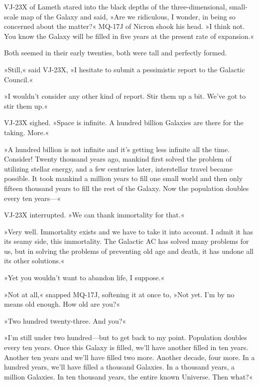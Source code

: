 \documentclass[11pt,twocolumn,paper=a5,pagesize,twoside]{scrartcl}
\newcommand{\q}[1]{»#1«}
\newcommand{\futuretwo}[1]{ #1 }
\newcommand{\specialinitiald}[1]{
\lettrine[lines=3,lhang=0.21,nindent=0em]{  
\fontspec{Final Frontier}\fontsize{48}{48}\selectfont #1}}
\begin{document}
\futuretwo{
\specialinitiald{V}{\selectfont J-23X} of Lameth stared into the black depths of the 
three-dimensional, small-scale map of the Galaxy and said, \q{Are we 
ridiculous, I wonder, in being so concerned about the matter?}
MQ-17J of Nicron shook his head. \q{I think not. You know the Galaxy 
will be filled in five years at the present rate of expansion.}

Both seemed in their early twenties, both were tall and perfectly formed.

\q{Still,} said VJ-23X, \q{I hesitate to submit a pessimistic report to the 
Galactic Council.}

\q{I wouldn't consider any other kind of report. Stir them up a bit. We've 
got to stir them up.}

VJ-23X sighed. \q{Space is infinite. A hundred billion Galaxies are there 
for the taking. More.}

\q{A hundred billion is not infinite and it's getting less infinite all the 
time. Consider! Twenty thousand years ago, mankind first solved the problem 
of utilizing stellar energy, and a few centuries later, interstellar travel 
became possible. It took mankind a million years to fill one small world and 
then only fifteen thousand years to fill the rest of the Galaxy. Now the 
population doubles every ten years---}

VJ-23X interrupted. \q{We can thank immortality for that.}

\q{Very well. Immortality exists and we have to take it into account. I admit 
it has its seamy side, this immortality. The Galactic AC has solved many 
problems for us, but in solving the problems of preventing old age and death, 
it has undone all its other solutions.}

\q{Yet you wouldn't want to abandon life, I suppose.}

\q{Not at all,} snapped MQ-17J, softening it at once to, \q{Not yet. I'm by 
no means old enough. How old are you?}

\q{Two hundred twenty-three. And you?}

\q{I'm still under two hundred---but to get back to my point. Population 
doubles every ten years. Once this Galaxy is filled, we'll have another 
filled in ten years. Another ten years and we'll have filled two more. 
Another decade, four more. In a hundred years, we'll have filled a thousand
Galaxies. In a thousand years, a million Galaxies. In ten thousand years, 
the entire known Universe. Then what?}

}
\end{document}
